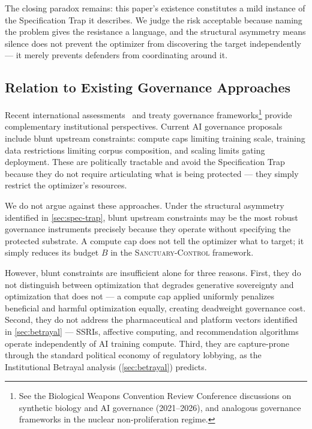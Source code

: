 \documentclass[11pt, a4paper]{article}
\theoremstyle{remark}
\newcommand{\SC}{\textsc{Sanctuary-Control}}
\begin{document}
The closing paradox remains: this paper's existence constitutes a mild instance of the Specification Trap it describes. We judge the risk acceptable because naming the problem gives the resistance a language, and the structural asymmetry means silence does not prevent the optimizer from discovering the target independently --- it merely prevents defenders from coordinating around it.

\subsection{Relation to Existing Governance Approaches}\label{sec:existing-governance}

Recent international assessments~\cite{bengio2026} and treaty governance frameworks\footnote{See the Biological Weapons Convention Review Conference discussions on synthetic biology and AI governance (2021--2026), and analogous governance frameworks in the nuclear non-proliferation regime.} provide complementary institutional perspectives. Current AI governance proposals include blunt upstream constraints: compute caps limiting training scale, training data restrictions limiting corpus composition, and scaling limits gating deployment. These are politically tractable and avoid the Specification Trap because they do not require articulating what is being protected --- they simply restrict the optimizer's resources.

We do not argue against these approaches. Under the structural asymmetry identified in \cref{sec:spec-trap}, blunt upstream constraints may be the most robust governance instruments precisely because they operate without specifying the protected substrate. A compute cap does not tell the optimizer what to target; it simply reduces its budget $B$ in the \SC{} framework.

However, blunt constraints are insufficient alone for three reasons. First, they do not distinguish between optimization that degrades generative sovereignty and optimization that does not --- a compute cap applied uniformly penalizes beneficial and harmful optimization equally, creating deadweight governance cost. Second, they do not address the pharmaceutical and platform vectors identified in \cref{sec:betrayal} --- SSRIs, affective computing, and recommendation algorithms operate independently of AI training compute. Third, they are capture-prone through the standard political economy of regulatory lobbying, as the Institutional Betrayal analysis (\cref{sec:betrayal}) predicts.
\end{document}
